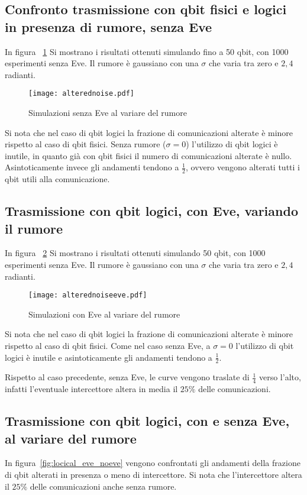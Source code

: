 \documentclass[11 pt, a4paper]{article}
\begin{document}
\clearpage
\subsection{Confronto trasmissione con qbit fisici e logici in presenza di rumore, senza Eve}

In figura ~\ref{fig:alteredvsnoise} Si mostrano i risultati ottenuti simulando fino a 50 qbit, con 1000 esperimenti senza Eve.
Il rumore è gaussiano con una $\sigma$ che varia tra zero e $2,4$ radianti.

\begin{figure}[htb!]
\centering
\texttt{[image: alterednoise.pdf]}
\caption{Simulazioni senza Eve al variare del rumore}
\label{fig:alteredvsnoise}
\end{figure}

Si nota che nel caso di qbit logici la frazione di comunicazioni alterate è minore rispetto al caso di qbit fisici.
Senza rumore ($\sigma=0$) l'utilizzo di qbit logici è inutile, in quanto già con qbit fisici il numero di comunicazioni alterate è nullo.
Asintoticamente invece gli andamenti tendono a $\frac{1}{2}$, ovvero vengono alterati tutti i qbit utili alla comunicazione.

\clearpage
\subsection{Trasmissione con qbit logici, con Eve, variando il rumore}
In figura ~\ref{fig:alteredvsnoiseeve} Si mostrano i risultati ottenuti simulando 50 qbit, con 1000 esperimenti senza Eve.
Il rumore è gaussiano con una $\sigma$ che varia tra zero e $2,4$ radianti.

\begin{figure}[htb!]
\centering
\texttt{[image: alterednoiseeve.pdf]}
\caption{Simulazioni con Eve al variare del rumore}
\label{fig:alteredvsnoiseeve}
\end{figure}

Si nota che nel caso di qbit logici la frazione di comunicazioni alterate è minore rispetto al caso di qbit fisici.
Come nel caso senza Eve, a $\sigma=0$ l'utilizzo di qbit logici è inutile e asintoticamente gli andamenti tendono a $\frac{1}{2}$.

Rispetto al caso precedente, senza Eve, le curve vengono traslate di $\frac{1}{4}$ verso l'alto, infatti l'eventuale intercettore altera in media il $25\%$ delle comunicazioni.

\newpage
\subsection{Trasmissione con qbit logici, con e senza Eve, al variare del rumore}
In figura~\ref{fig:locical_eve_noeve} vengono confrontati gli andamenti della frazione di qbit alterati in presenza o meno di intercettore. Si nota che l'intercettore altera il $25\%$ delle comunicazioni anche senza rumore.
\end{document}
